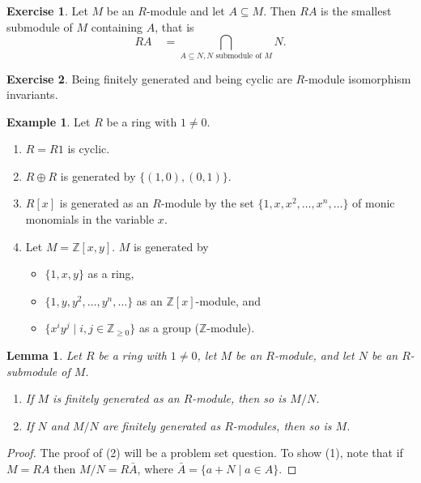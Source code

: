 \documentclass[12pt]{report}
\newtheorem{lemma}[theorem]{Lemma}
\numberwithin{equation}{section}
\numberwithin{theorem}{chapter}
\theoremstyle{definition}
\newtheorem{example}[theorem]{Example}
\newtheorem{exercise}{Exercise}
\newtheorem*{basic properties}{Basic Properties}
\newtheorem*{Important Remark}{Important Remark}
\begin{document}
\begin{exercise}
 Let $M$ be an $R$-module and let $A \subseteq M$. Then $RA$ is the smallest submodule of $M$ containing $A$, that is 
 $$RA \quad = \bigcap\limits_{A\subseteq N, N \text{ submodule of }M} N.$$
\end{exercise}

\begin{exercise}
Being finitely generated and being cyclic are $R$-module isomorphism invariants.
\end{exercise}

\begin{example}
Let $R$ be a ring with $1 \neq 0$.
\begin{enumerate}[label=(\arabic*),leftmargin=20pt]
\item $R = R1$ is cyclic. 
\item $R \oplus R $ is generated by $\{(1,0),(0,1)\}$. 
\item $R[x]$ is generated as an $R$-module by the set $\{1,x,x^2,\ldots, x^n,\ldots\}$ of monic monomials in the variable $x$.
\item Let $M = \mathbb{Z}[x,y]$. $M$ is generated by 
\begin{itemize}
\item $\{1,x,y\}$ as a ring,  
\item $\{1,y,y^2,\ldots, y^n,\ldots\}$ as an $\mathbb{Z}[x]$-module, and 
\item $\{x^iy^j \mid  i,j \in \mathbb{Z}_{\geqslant 0}\}$ as a group ($\mathbb{Z}$-module).
\end{itemize}
\end{enumerate}
\end{example}
 
\begin{lemma}\label{lem:fg}
 Let $R$ be a ring with $1 \neq 0$, let $M$ be an $R$-module, and let $N$ be an $R$-submodule of $M$. 
\begin{enumerate}[label=(\arabic*),leftmargin=20pt]
\item  If $M$ is finitely generated as an $R$-module, then so is $M/N$. 
\item If $N$ and $M/N$ are finitely generated as $R$-modules, then so is $M$.
\end{enumerate}
\end{lemma}

\begin{proof}
The proof of (2) will be a problem set question. To show (1), note that if $M=RA$ then $M/N=R\bar{A}$, where $\bar{A}=\{a+N \mid a\in A\}$. 
\end{proof}
\end{document}
